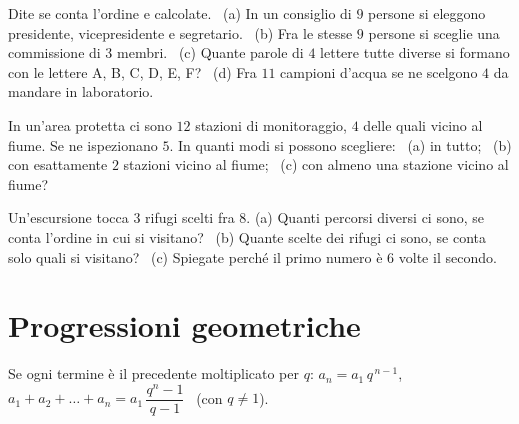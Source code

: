 \begin{esercizio}[\liv{1}]
Dite se conta l'ordine e calcolate. \ (a) In un consiglio di $9$ persone si eleggono presidente, vicepresidente e segretario. \ (b) Fra le stesse $9$ persone si sceglie una commissione di $3$ membri. \ (c) Quante parole di $4$ lettere tutte diverse si formano con le lettere A, B, C, D, E, F? \ (d) Fra $11$ campioni d'acqua se ne scelgono $4$ da mandare in laboratorio.
\end{esercizio}

\begin{esercizio}[\liv{2}]
In un'area protetta ci sono $12$ stazioni di monitoraggio, $4$ delle quali vicino al fiume. Se ne ispezionano $5$. In quanti modi si possono scegliere: \ (a) in tutto; \ (b) con esattamente $2$ stazioni vicino al fiume; \ (c) con almeno una stazione vicino al fiume?
\end{esercizio}

\begin{esercizio}[\liv{2}]
Un'escursione tocca $3$ rifugi scelti fra $8$. (a) Quanti percorsi diversi ci sono, se conta l'ordine in cui si visitano? \ (b) Quante scelte dei rifugi ci sono, se conta solo quali si visitano? \ (c) Spiegate perché il primo numero è $6$ volte il secondo.
\end{esercizio}

\section{Progressioni geometriche}

\begin{vuoto}[Promemoria]{}
Se ogni termine è il precedente moltiplicato per $q$: $a_n=a_1\,q^{\,n-1}$, \quad $a_1+a_2+\dots+a_n=a_1\,\dfrac{q^n-1}{q-1}$ \ (con $q\ne1$).
\end{vuoto}

